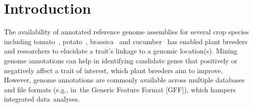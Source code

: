 \documentclass[applsci,article,accept,moreauthors,pdftex]{Definitions/mdpi}
\begin{document}


\section{Introduction}
The availability of annotated reference genome assemblies for several crop species including tomato~\cite{tomato2012tomato}, potato~\cite{potato2011genome}, brassica~\cite{wang2011genome} and cucumber~\cite{huang2009genome} has enabled plant breeders and researchers to elucidate a trait’s linkage to a genomic location(s). Mining genome annotations can help in identifying candidate genes that positively or negatively affect a trait of interest, which plant breeders aim to improve. However, genome annotations are commonly available across multiple databases and file formats (e.g., in~the Generic Feature Format [GFF]), which hampers integrated data~analyses.
\end{document}
